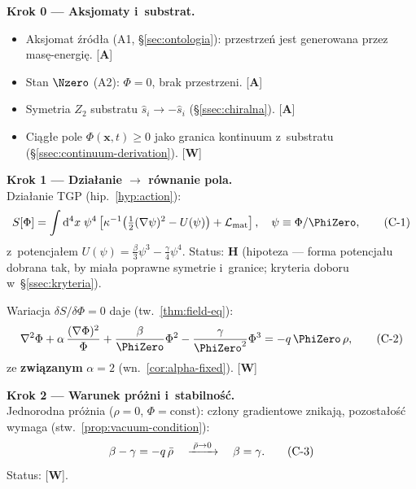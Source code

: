 \bigskip
\noindent\textbf{Krok 0 --- Aksjomaty i~substrat.}
\begin{itemize}[nosep]
  \item Aksjomat \'zr\'od\l{}a (A1, \S\ref{sec:ontologia}):
    przestrze\'n jest generowana przez mas\k{e}-energi\k{e}. [\textbf{A}]
  \item Stan $\Nzero$ (A2): $\Phi = 0$, brak przestrzeni. [\textbf{A}]
  \item Symetria $Z_2$ substratu $\hat s_i \to -\hat s_i$
    (\S\ref{ssec:chiralna}). [\textbf{A}]
  \item Ci\k{a}g\l{}e pole $\Phi(\mathbf{x},t) \geq 0$ jako granica
    kontinuum z~substratu
    (\S\ref{ssec:continuum-derivation}). [\textbf{W}]
\end{itemize}

\bigskip
\noindent\textbf{Krok 1 --- Dzia\l{}anie $\boldsymbol{\to}$ r\'ownanie pola.}\\[2pt]
Dzia\l{}anie TGP (hip.~\ref{hyp:action}):
\begin{equation}\label{eq:chain-action}
  S[\Phi] = \int \mathrm{d}^4x\;\psi^4
  \left[\kappa^{-1}\bigl(\tfrac{1}{2}(\nabla\psi)^2
  - U(\psi)\bigr) + \mathcal{L}_{\mathrm{mat}}\right],
  \quad \psi \equiv \Phi/\PhiZero,
  \tag{$\mathrm{C}$-1}
\end{equation}
z~potencja\l{}em $U(\psi) = \tfrac{\beta}{3}\psi^3
- \tfrac{\gamma}{4}\psi^4$.
Status: \textbf{H} (hipoteza --- forma potencja\l{}u dobrana
tak, by mia\l{}a poprawne symetrie i~granice; kryteria
doboru w~\S\ref{ssec:kryteria}).

Wariacja $\delta S / \delta \Phi = 0$ daje
(tw.~\ref{thm:field-eq}):
\begin{equation}\label{eq:chain-field}
  \nabla^2\Phi + \alpha\,\frac{(\nabla\Phi)^2}{\Phi}
  + \frac{\beta}{\PhiZero}\Phi^2
  - \frac{\gamma}{\PhiZero^2}\Phi^3
  = -q\,\PhiZero\,\rho,
  \tag{$\mathrm{C}$-2}
\end{equation}
ze \textbf{zwi\k{a}zanym} $\alpha = 2$
(wn.~\ref{cor:alpha-fixed}). [\textbf{W}]

\bigskip
\noindent\textbf{Krok 2 --- Warunek pr\'o\.zni i~stabilno\'s\'c.}\\[2pt]
Jednorodna pr\'o\.znia ($\rho = 0$, $\Phi = \mathrm{const}$):
cz\l{}ony gradientowe znikaj\k{a}, pozosta\l{}o\'s\'c wymaga
(stw.~\ref{prop:vacuum-condition}):
\begin{equation}\label{eq:chain-vacuum}
  \beta - \gamma = -q\,\bar\rho
  \quad\xrightarrow{\;\bar\rho \to 0\;}\quad
  \beta = \gamma.
  \tag{$\mathrm{C}$-3}
\end{equation}
Status: [\textbf{W}].

